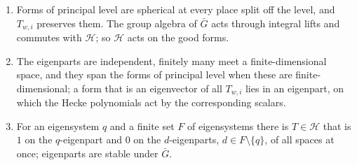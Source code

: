 \begin{proposition}\label{prop:hecke-eigen}
\begin{enumerate}[label=\textup{(\alph*)}]
\item Forms of principal level are spherical at every place split off the level, and $T_{w,i}$ preserves them. The group algebra of $\bar G$ acts through integral lifts and
commutes with $\mathcal H$; so $\mathcal H$ acts on the good forms.
\item The eigenparts are independent, finitely many meet a finite-dimensional space, and they span the forms of principal level when these are finite-dimensional; a
form that is an eigenvector of all $T_{w,i}$ lies in an eigenpart, on which the Hecke polynomials act by the corresponding scalars.
\item For an eigensystem $q$ and a finite set $F$ of eigensystems there is $T\in\mathcal H$ that is $1$ on the $q$-eigenpart and $0$ on the $d$-eigenparts, $d\in F\setminus\{q\}$, of
all spaces at once; eigenparts are stable under $\bar G$.
\end{enumerate}
\end{proposition}

